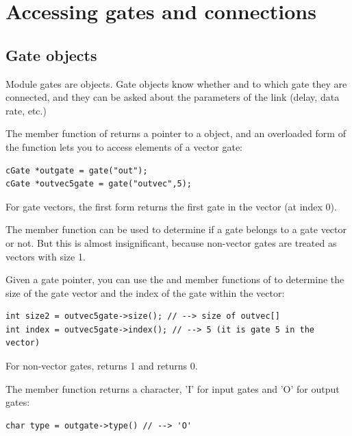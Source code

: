 \section{Accessing gates and connections}
\label{ch:simple-modules:gates}

\subsection{Gate objects}


Module gates are  objects. Gate objects
know whether and to which gate they are connected, and they can be
asked about the parameters of the link (delay, data rate, etc.)

The  member function of  returns a
pointer to a  object, and an overloaded form of the
function lets you to access elements of a vector gate:

\begin{verbatim}
cGate *outgate = gate("out");
cGate *outvec5gate = gate("outvec",5);
\end{verbatim}


For gate vectors, the first form returns the first gate in the
vector (at index 0).


The  member function can be used to determine if a
gate belongs to a gate vector or not. But this is almost insignificant,
because non-vector gates are treated as vectors with size 1.


Given a gate pointer, you can use the  and
 member functions of  to determine the
size of the gate vector and the
index of the gate within the vector:

\begin{verbatim}
int size2 = outvec5gate->size(); // --> size of outvec[]
int index = outvec5gate->index(); // --> 5 (it is gate 5 in the vector)
\end{verbatim}


For non-vector gates,  returns 1 and  returns 0.

The  member function returns a character, 'I' for input
gates and 'O' for output gates:

\begin{verbatim}
char type = outgate->type() // --> 'O'
\end{verbatim}

